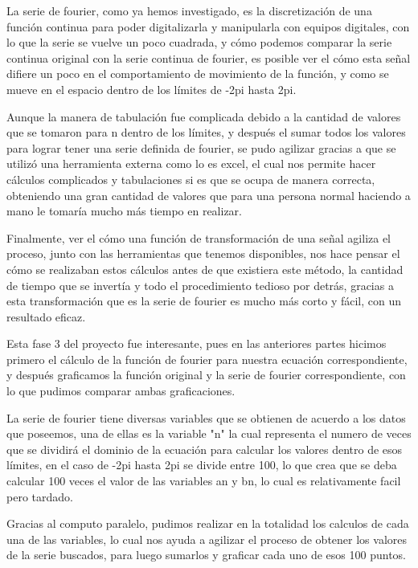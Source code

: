 La serie de fourier, como ya hemos investigado, es la discretización de una función continua para poder digitalizarla y manipularla con equipos digitales, con lo que la serie se vuelve un poco cuadrada, y cómo podemos comparar la serie continua original con la serie continua de fourier, es posible ver el cómo esta señal difiere un poco en el comportamiento de movimiento de la función, y como se mueve en el espacio dentro de los límites de -2pi hasta 2pi.

Aunque la manera de tabulación fue complicada debido a la cantidad de valores que se tomaron para n dentro de los límites, y después el sumar todos los valores para lograr tener una serie definida de fourier, se pudo agilizar gracias a que se utilizó una herramienta externa como lo es excel, el cual nos permite hacer cálculos complicados y tabulaciones si es que se ocupa de manera correcta, obteniendo una gran cantidad de valores que para una persona normal haciendo a mano le tomaría mucho más tiempo en realizar.

Finalmente, ver el cómo una función de transformación de una señal agiliza el proceso, junto con las herramientas que tenemos disponibles, nos hace pensar el cómo se realizaban estos cálculos antes de que existiera este método, la cantidad de tiempo que se invertía y todo el procedimiento tedioso por detrás, gracias a esta transformación que es la serie de fourier es mucho más corto y fácil, con un resultado eficaz.

Esta fase 3 del proyecto fue interesante, pues en las anteriores partes hicimos primero el cálculo de la función de fourier para nuestra ecuación correspondiente, y después graficamos la función original y la serie de fourier correspondiente, con lo que pudimos comparar ambas graficaciones.

La serie de fourier tiene diversas variables que se obtienen de acuerdo a los datos que poseemos, una de ellas es la variable "n" la cual representa el numero de veces que se dividirá el dominio de la ecuación para calcular los valores dentro de esos límites, en el caso de -2pi hasta 2pi se divide entre 100, lo que crea que se deba calcular 100 veces el valor de las variables an y bn, lo cual es relativamente facil pero tardado.

Gracias al computo paralelo, pudimos realizar en la totalidad los calculos de cada una de las variables, lo cual nos ayuda a agilizar el proceso de obtener los valores de la serie buscados, para luego sumarlos y graficar cada uno de esos 100 puntos.

